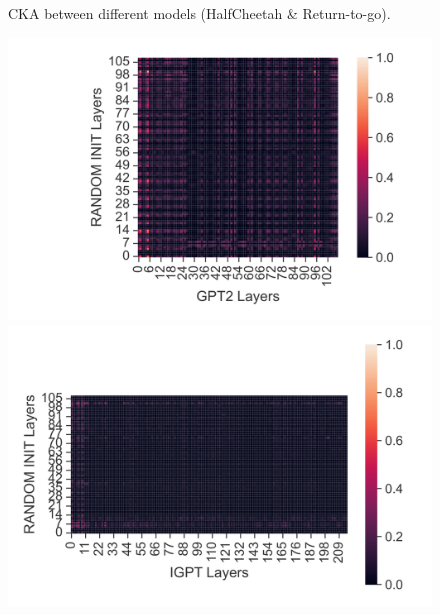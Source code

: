 \documentclass{article}
\begin{document}
\begin{figure}[H]
\begin{minipage}[b]{0.32\linewidth}
    \end{minipage}
    \caption{CKA between different models (HalfCheetah \& Return-to-go).}
\end{figure}

\begin{figure}[H]
    \centering
    \begin{minipage}[b]{0.32\linewidth}
        \includegraphics[width=\linewidth]{figs/cka_40_40_dtgpt2_halfcheetah_medium_666_action.png}
    \end{minipage}
    \begin{minipage}[b]{0.32\linewidth}
        \includegraphics[width=\linewidth]{figs/cka_40_40_dtigpt_halfcheetah_medium_666_action.png}
    \end{minipage}
    \begin{minipage}[b]{0.32\linewidth}

\end{minipage}
\end{figure}
\end{document}
